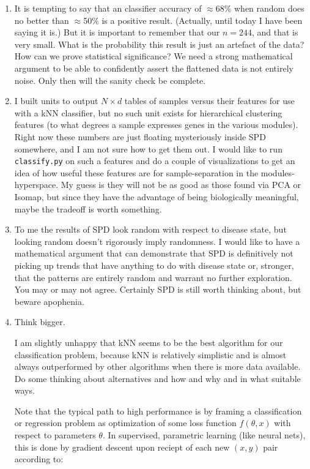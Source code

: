 \documentclass[]{article}
\begin{document}
\begin{enumerate}
    \item It is tempting to say that an classifier accuracy of $\approx$68\% when random does no better than $\approx$50\% is a positive result. (Actually, until today I have been saying it is.) But it is important to remember that our $n = 244$, and that is very small. What is the probability this result is just an artefact of the data? How can we prove statistical significance? We need a strong mathematical argument to be able to confidently assert the flattened data is not entirely noise. Only then will the sanity check be complete.

    \item I built units to output $N \times d$ tables of samples versus their features for use with a kNN classifier, but no such unit exists for hierarchical clustering features (to what degrees a sample expresses genes in the various modules). Right now these numbers are just floating mysteriously inside SPD somewhere, and I am not sure how to get them out. I would like to run \texttt{classify.py} on such a features and do a couple of visualizations to get an idea of how useful these features are for sample-separation in the modules-hyperspace. My guess is they will not be as good as those found via PCA or Isomap, but since they have the advantage of being biologically meaningful, maybe the tradeoff is worth something.

    \item To me the results of SPD look random with respect to disease state, but looking random doesn't rigorously imply randomness. I would like to have a mathematical argument that can demonstrate that SPD is definitively not picking up trends that have anything to do with disease state or, stronger, that the patterns are entirely random and warrant no further exploration. You may or may not agree. Certainly SPD is still worth thinking about, but beware apophenia.

    \item Think bigger.

    I am slightly unhappy that kNN seems to be the best algorithm for our classification problem, because kNN is relatively simplistic and is almost always outperformed by other algorithms when there is more data available. Do some thinking about alternatives and how and why and in what suitable ways.

    \vspace{-1mm} \quad Note that the typical path to high performance is by framing a classification or regression problem as optimization of some loss function $f(\theta, x)$ with respect to parameters $\theta$. In supervised, parametric learning (like neural nets), this is done by gradient descent upon reciept of each new $(x,y)$ pair according to:


\end{enumerate}
\end{document}
